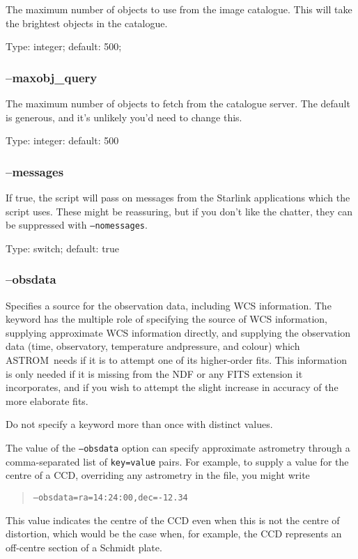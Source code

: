 \documentclass[twoside,11pt]{article}
\newcommand{\xlabel}[1]{}
\newcommand{\ASTROM}{{\footnotesize ASTROM}\normalsize}
\begin{document}
The maximum number of objects to use from the image catalogue. This will take
the brightest objects in the catalogue.

Type: integer; default: 500;

\subsubsection{\xlabel{sb_options_maxobj_query}--maxobj\_query\label{sb:options:maxobj_query}}

The maximum number of objects to fetch from the catalogue server. The default
is generous, and it's unlikely you'd need to change this.

Type: integer: default: 500

\subsubsection{\xlabel{sb_options_messages}--messages\label{sb:options:messages}}

If true, the script will pass on messages from the Starlink applications which
the script uses.  These might be reassuring, but if you don't like the
chatter, they can be suppressed with \texttt{--nomessages}.

Type: switch; default: true

\subsubsection{\xlabel{sb_options_obsdata}--obsdata\label{sb:options:obsdata}}

Specifies a source for the observation data, including WCS information.  The
keyword has the multiple role of specifying the source of WCS information,
supplying approximate WCS information directly, and supplying the observation
data (time, observatory, temperature andpressure, and colour) which \ASTROM\
needs if it is to attempt one of its higher-order fits.  This information is
only needed if it is missing from the NDF or any FITS extension it
incorporates, and if you wish to attempt the slight increase in accuracy of
the more elaborate fits.

Do not specify a keyword more than once with distinct values.

The value of the \texttt{--obsdata} option can specify approximate astrometry
through a comma-separated list of \texttt{key=value} pairs.  For example, to
supply a value for the centre of a CCD, overriding any astrometry in the file,
you might write
\begin{quote}
  \texttt{--obsdata=ra=14:24:00,dec=-12.34}
\end{quote}
This value indicates the centre of the CCD even when this is not the centre of
distortion, which would be the case when, for example, the CCD represents an
off-centre section of a Schmidt plate.
\end{document}
